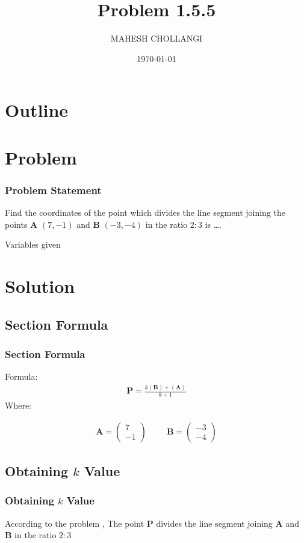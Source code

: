 \documentclass{beamer}
\title{Problem 1.5.5}
\author{MAHESH CHOLLANGI}
\date{\today}
\providecommand{\brak}[1]{\ensuremath{\left(#1\right)}}
\theoremstyle{remark}
\newcommand{\myvec}[1]{\ensuremath{\begin{pmatrix}#1\end{pmatrix}}}
\let\vec\mathbf
\numberwithin{equation}{section}
\begin{document}
\begin{frame}
\titlepage
\end{frame}

\section*{Outline}
\begin{frame}
\tableofcontents
\end{frame}
\section{Problem}
\begin{frame}
\frametitle{Problem Statement}
%
 Find the coordinates of the point which divides the line segment joining the points $\vec{A}$ $\brak{7,-1}$ and $\vec{B}$ $\brak{-3, -4}$ in the ratio $2 : 3$ is \dots.
 \begin{table}[h!]    
  \centering
  
  \caption{Variables given}
  \label{tab 1.4.9.2}
\end{table}
\end{frame}

\section{Solution}
\subsection{Section Formula}
\begin{frame}
\frametitle{Section Formula}
Formula:
\begin{align}
\vec{P}=\frac{k(\vec{B})+(\vec{A})}{k+1}
\end{align}
Where: 


\begin{align}
\vec{A}=\myvec{7\\-1} \hspace{1cm} \vec{B}=\myvec{-3\\-4} 
\end{align}

\end{frame}
\subsection{Obtaining $k$ Value}
\begin{frame}
\frametitle{Obtaining $k$ Value}
According to the problem , 
The point $\vec{P}$ divides the line segment joining $\vec{A}$ and $\vec{B}$ in the ratio $2:3$

\end{frame}
\end{document}
